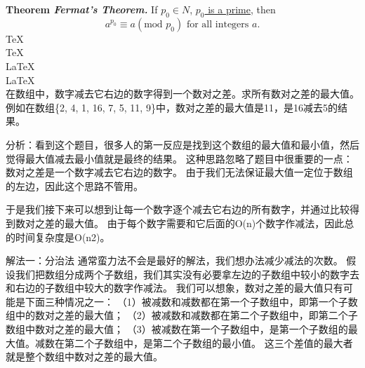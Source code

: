 \documentclass{article}
\begin{document}
\begin{CJK*}{UTF8}{gkai}

\noindent
\textbf{Theorem \textit{Fermat's Theorem.}} If $ p_0 \in \mathit{N} $, \underline{$ p_0 $ is a prime},
then $$ a^{p_0} \equiv a (\mbox{mod }p_0) \mbox{ for all integers } a. $$
\TeX \\
\TeX{} \\
\LaTeX \\
\LaTeX{} \\

在数组中，数字减去它右边的数字得到一个数对之差。求所有数对之差的最大值。
例如在数组\{2, 4, 1, 16, 7, 5, 11, 9\}中，数对之差的最大值是11，是16减去5的结果。

分析：看到这个题目，很多人的第一反应是找到这个数组的最大值和最小值，然后觉得最大值减去最小值就是最终的结果。
这种思路忽略了题目中很重要的一点：数对之差是一个数字减去它右边的数字。
由于我们无法保证最大值一定位于数组的左边，因此这个思路不管用。

于是我们接下来可以想到让每一个数字逐个减去它右边的所有数字，并通过比较得到数对之差的最大值。
由于每个数字需要和它后面的O(n)个数字作减法，因此总的时间复杂度是O(n2)。

解法一：分治法
通常蛮力法不会是最好的解法，我们想办法减少减法的次数。
假设我们把数组分成两个子数组，我们其实没有必要拿左边的子数组中较小的数字去和右边的子数组中较大的数字作减法。
我们可以想象，数对之差的最大值只有可能是下面三种情况之一：
（1）被减数和减数都在第一个子数组中，即第一个子数组中的数对之差的最大值；
（2）被减数和减数都在第二个子数组中，即第二个子数组中数对之差的最大值；
（3）被减数在第一个子数组中，是第一个子数组的最大值。减数在第二个子数组中，是第二个子数组的最小值。
这三个差值的最大者就是整个数组中数对之差的最大值。
\end{CJK*}
\end{document}
